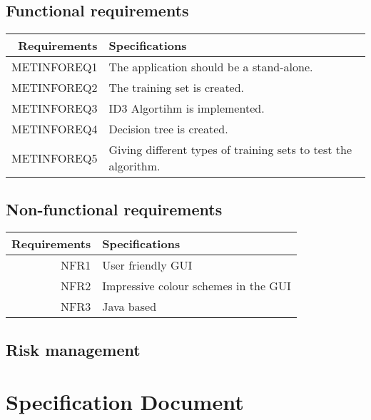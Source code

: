 \documentclass{report}
\begin{document}
\section{Functional requirements}
\label{sec:functreq}

\begin{center}
\begin{tabular}{|r|l|}

\hline
Requirements & Specifications\\[5pt]
\hline

METINFOREQ1 &
The application should be a stand-alone.
\\\hline

METINFOREQ2 &
The training set is created.
\\\hline

METINFOREQ3&
ID3 Algortihm is implemented.
\\\hline

METINFOREQ4&
Decision tree is created.
\\\hline

METINFOREQ5&
Giving different types of training sets to test the algorithm.
\\\hline

\end{tabular}
\end{center}


\section{Non-functional requirements}
\label{sec:nonfuncreq}

\begin{tabular}{|r|l|}

\hline
Requirements & Specifications\\[5pt]
\hline
NFR1&
User friendly GUI
\\\hline

NFR2&
Impressive colour schemes in the GUI
\\\hline

NFR3&
Java based
\\\hline

\end{tabular}




\section{Risk management}
\label{sec:riskman}




\chapter{Specification Document}
\label{cha:specdoc}








\end{document}
